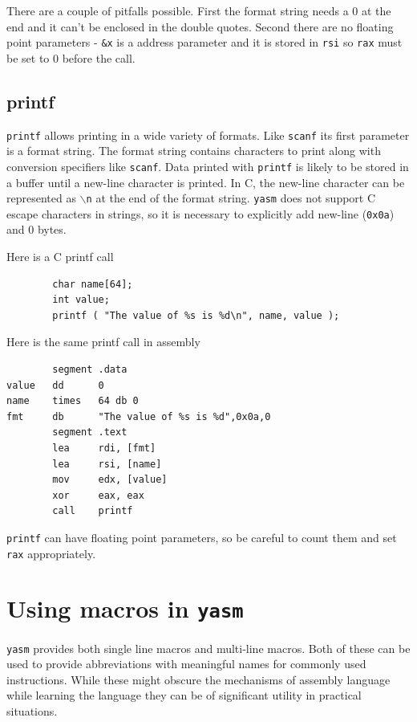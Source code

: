 \documentclass[11pt,b5paper]{book}
\begin{document}
There are a couple of pitfalls possible.
First the format string needs a 0 at the end and it can't be enclosed in the double quotes.
Second there are no floating point parameters - {\tt \&x} is a address parameter and it is
stored in {\tt rsi} so {\tt rax} must be set to 0 before the call.

\section{printf}

{\tt printf} allows printing in a wide variety of formats.
Like {\tt scanf} its first parameter is a format string.
The format string contains characters to print along with conversion specifiers like {\tt scanf}.
Data printed with {\tt printf} is likely to be stored in a buffer until a new-line character is
printed.
In C, the new-line character can be represented as {\tt $\backslash$n} at the end of the format string.
{\tt yasm} does not support C escape characters in strings, so it is necessary to explicitly 
add new-line ({\tt 0x0a}) and 0 bytes.

Here is a C printf call
\begin{verbatim}
        char name[64];
        int value;
        printf ( "The value of %s is %d\n", name, value );
\end{verbatim}

Here is the same printf call in assembly
\begin{verbatim}
        segment .data
value   dd      0
name    times   64 db 0
fmt     db      "The value of %s is %d",0x0a,0
        segment .text
        lea     rdi, [fmt]
        lea     rsi, [name]
        mov     edx, [value]
        xor     eax, eax
        call    printf
\end{verbatim}

{\tt printf} can have floating point parameters, so be careful to count them and set {\tt rax} appropriately.

\chapter{Using macros in {\tt yasm}}

{\tt yasm} provides both single line macros and multi-line macros.
Both of these can be used to provide abbreviations with meaningful names
for commonly used instructions.
While these might obscure the mechanisms of assembly language while learning
the language they can be of significant utility in practical situations.
\end{document}
